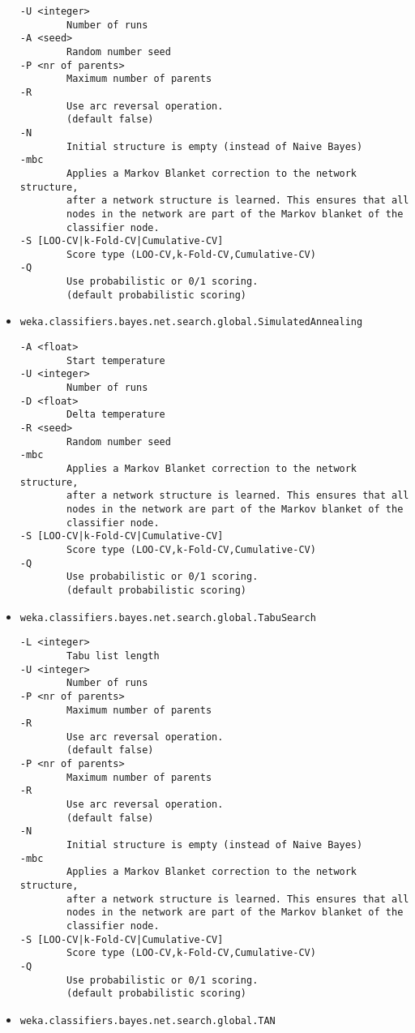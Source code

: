 \documentclass[a4paper]{article}
\begin{document}
\begin{itemize}
\begin{verbatim}
-U <integer>
        Number of runs
-A <seed>
        Random number seed
-P <nr of parents>
        Maximum number of parents
-R
        Use arc reversal operation.
        (default false)
-N
        Initial structure is empty (instead of Naive Bayes)
-mbc
        Applies a Markov Blanket correction to the network structure,
        after a network structure is learned. This ensures that all
        nodes in the network are part of the Markov blanket of the
        classifier node.
-S [LOO-CV|k-Fold-CV|Cumulative-CV]
        Score type (LOO-CV,k-Fold-CV,Cumulative-CV)
-Q
        Use probabilistic or 0/1 scoring.
        (default probabilistic scoring)
  \end{verbatim}
\item \texttt{weka.classifiers.bayes.net.search.global.SimulatedAnnealing}
  \begin{verbatim}
-A <float>
        Start temperature
-U <integer>
        Number of runs
-D <float>
        Delta temperature
-R <seed>
        Random number seed
-mbc
        Applies a Markov Blanket correction to the network structure,
        after a network structure is learned. This ensures that all
        nodes in the network are part of the Markov blanket of the
        classifier node.
-S [LOO-CV|k-Fold-CV|Cumulative-CV]
        Score type (LOO-CV,k-Fold-CV,Cumulative-CV)
-Q
        Use probabilistic or 0/1 scoring.
        (default probabilistic scoring)
  \end{verbatim}
\item \texttt{weka.classifiers.bayes.net.search.global.TabuSearch}
  \begin{verbatim}
-L <integer>
        Tabu list length
-U <integer>
        Number of runs
-P <nr of parents>
        Maximum number of parents
-R
        Use arc reversal operation.
        (default false)
-P <nr of parents>
        Maximum number of parents
-R
        Use arc reversal operation.
        (default false)
-N
        Initial structure is empty (instead of Naive Bayes)
-mbc
        Applies a Markov Blanket correction to the network structure,
        after a network structure is learned. This ensures that all
        nodes in the network are part of the Markov blanket of the
        classifier node.
-S [LOO-CV|k-Fold-CV|Cumulative-CV]
        Score type (LOO-CV,k-Fold-CV,Cumulative-CV)
-Q
        Use probabilistic or 0/1 scoring.
        (default probabilistic scoring)
  \end{verbatim}
\item \texttt{weka.classifiers.bayes.net.search.global.TAN}

\end{itemize}
\end{document}
